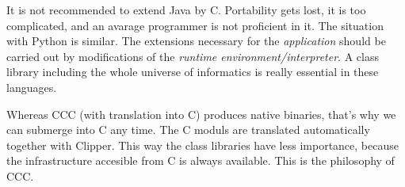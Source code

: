 It is not recommended to extend Java by C. 
Portability gets lost, it is too complicated,
and an avarage programmer is not proficient in it. 
The situation with Python is similar.
The extensions  necessary for the  {\em application} should be 
carried out by modifications of  the
{\em runtime environment/interpreter}. A class library including the whole 
universe of informatics is really essential in these languages. 

Whereas CCC (with  translation into C) produces native  
binaries, that's why we can submerge into C any time.
The C moduls are translated automatically together with Clipper.
This way the class libraries have less importance, because the infrastructure
accesible from C is always available.  
This is the philosophy of CCC.


